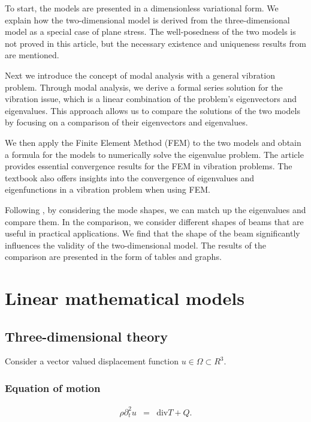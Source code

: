 To start, the models are presented in a dimensionless variational form. We explain how the two-dimensional model is derived from the three-dimensional model as a special case of plane stress. The well-posedness of the two models is not proved in this article, but the necessary existence and uniqueness results from \cite{VV02} are mentioned.

Next we introduce the concept of modal analysis with a general vibration problem. Through modal analysis, we derive a formal series solution for the vibration issue, which is a linear combination of the problem's eigenvectors and eigenvalues. This approach allows us to compare the solutions of the two models by focusing on a comparison of their eigenvectors and eigenvalues.

We then apply the Finite Element Method (FEM) to the two models and obtain a formula for the models to numerically solve the eigenvalue problem. The article \cite{BV13} provides essential convergence results for the FEM in vibration problems. The textbook \cite{SF73} also offers insights into the convergence of eigenvalues and eigenfunctions in a vibration problem when using FEM. 

Following \cite{LVV09}, by considering the mode shapes, we can match up the eigenvalues and compare them. In the comparison, we consider different shapes of beams that are useful in practical applications. We find that the shape of the beam significantly influences the validity of the two-dimensional model. The results of the comparison are presented in the form of tables and graphs.

\section{Linear mathematical models}
	\subsection{Three-dimensional theory}
		Consider a vector valued displacement function $u \in \Omega \subset R^3$.

		\subsubsection*{Equation of motion}\label{ssec:3D_Model:EquationOfMotion}
		\begin{eqnarray}
			\rho\partial_t^2 u & = & \textrm{div}T + Q. \label{eq:3D_Model:EM}
		\end{eqnarray} \label{sym:rho} \label{sym:partial_diff} \label{sym:T} \label{sym:Q}

